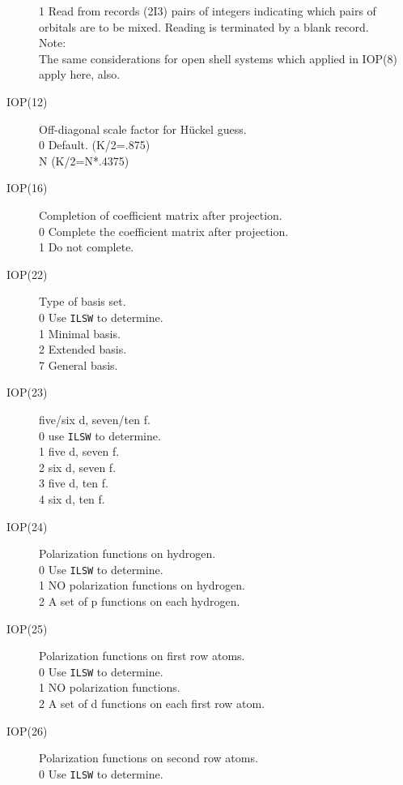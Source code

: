\begin{description}
1  Read from records (2I3) pairs of integers indicating which pairs of 
orbitals are to be mixed.  Reading is terminated by a blank record.  \\
Note:  \\
The same considerations for open shell systems which
applied in IOP(8) apply here, also.
\item[IOP(12)]  Off-diagonal scale factor for H\"{u}ckel guess.  \\
0  Default.  (K/2=.875) \\
N (K/2=N*.4375)
\item[IOP(16)]  Completion of coefficient matrix after projection.  \\
0  Complete the coefficient matrix after projection. \\
1  Do not complete. \\
\item[IOP(22)]  Type of basis set.  \\
0  Use {\tt ILSW} to determine. \\
1  Minimal basis. \\
2  Extended basis. \\
7  General basis. \\
\item[IOP(23)]  five/six d, seven/ten f.  \\
0  use {\tt ILSW} to determine. \\
1  five d, seven f. \\
2  six d, seven f. \\
3  five d, ten f. \\
4  six d, ten f. \\
\item[IOP(24)]  Polarization functions on hydrogen.  \\
0  Use {\tt ILSW} to determine. \\
1  NO polarization functions on hydrogen. \\
2  A set of p functions on each hydrogen. \\
\item[IOP(25)]  Polarization functions on first row atoms.  \\
0  Use {\tt ILSW} to determine. \\
1  NO polarization functions. \\
2  A set of d functions on each first row atom. \\
\item[IOP(26)]  Polarization functions on second row atoms.  \\
0  Use {\tt ILSW} to determine. \\

\end{description}
